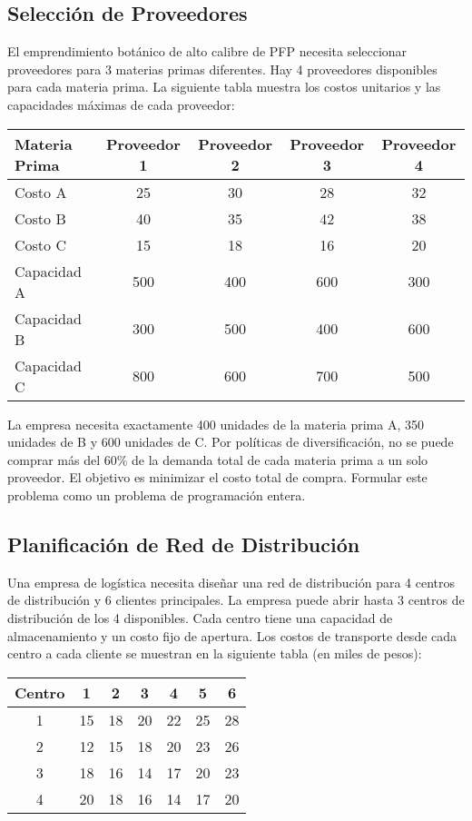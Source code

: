 \documentclass[12pt]{article}
\begin{document}
\subsection{Selección de Proveedores}
El emprendimiento botánico de alto calibre de PFP necesita seleccionar proveedores para 3 materias primas diferentes. Hay 4 proveedores disponibles para cada materia prima. La siguiente tabla muestra los costos unitarios y las capacidades máximas de cada proveedor:

\begin{table}[h]
\centering
\begin{tabular}{lcccc}
\toprule
\textbf{Materia Prima} & \textbf{Proveedor 1} & \textbf{Proveedor 2} & \textbf{Proveedor 3} & \textbf{Proveedor 4} \\
\midrule
Costo A & 25 & 30 & 28 & 32 \\
Costo B & 40 & 35 & 42 & 38 \\
Costo C & 15 & 18 & 16 & 20 \\
\midrule
Capacidad A & 500 & 400 & 600 & 300 \\
Capacidad B & 300 & 500 & 400 & 600 \\
Capacidad C & 800 & 600 & 700 & 500 \\
\bottomrule
\end{tabular}
\end{table}

La empresa necesita exactamente 400 unidades de la materia prima A, 350 unidades de B y 600 unidades de C. Por políticas de diversificación, no se puede comprar más del 60\% de la demanda total de cada materia prima a un solo proveedor. El objetivo es minimizar el costo total de compra. Formular este problema como un problema de programación entera.

\subsection{Planificación de Red de Distribución}
Una empresa de logística necesita diseñar una red de distribución para 4 centros de distribución y 6 clientes principales. La empresa puede abrir hasta 3 centros de distribución de los 4 disponibles. Cada centro tiene una capacidad de almacenamiento y un costo fijo de apertura. Los costos de transporte desde cada centro a cada cliente se muestran en la siguiente tabla (en miles de pesos):

\begin{table}[h]
\centering
\begin{tabular}{ccccccc}
\toprule
\textbf{Centro} & \textbf{1} & \textbf{2} & \textbf{3} & \textbf{4} & \textbf{5} & \textbf{6} \\
\midrule
1 & 15 & 18 & 20 & 22 & 25 & 28 \\
2 & 12 & 15 & 18 & 20 & 23 & 26 \\
3 & 18 & 16 & 14 & 17 & 20 & 23 \\
4 & 20 & 18 & 16 & 14 & 17 & 20 \\
\bottomrule
\end{tabular}
\end{table}
\end{document}
